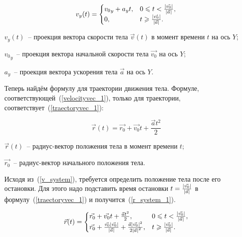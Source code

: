 \begin{equation}\label{v_y_1}
  v_y(t) =
  \begin{cases}
    {v_0}_y + a_y t, & 0  \leqslant t < \frac{\left|\vec{v_0}\right|}{\left|\vec{a}\right|}, \\
    0,               & t \geqslant \frac{\left|\vec{v_0}\right|}{\left|\vec{a}\right|}.
  \end{cases}
\end{equation}

\begin{Underequation}
  \(v_y(t)\)~-- проекция вектора скорости тела \(\vec{v}(t)\) в момент времени \(t\) на ось \(Y\);

  \({v_0}_y\)~-- проекция вектора начальной скорости тела \(\vec{v_0}\) на ось \(Y\);

  \(a_y\)~-- проекция вектора ускорения тела \(\vec{a}\) на ось \(Y\).
\end{Underequation}

Теперь найдём формулу для траектории движения тела. Формуле, соответствующей~(\ref{velocityvec_1}),
только для траектории, соответствует~(\ref{traectoryvec_1}):

\begin{equation}\label{traectoryvec_1}
  \vec{r}(t) = \vec{r_0} + \vec{v_0}t + \frac{\vec{a}t^2}{2}
\end{equation}

\begin{Underequation}
  \(\vec{r}(t)\)~-- радиус-вектор положения тела в момент времени \(t\);

  \(\vec{r_0}\)~-- радиус-вектор начального положения тела.
\end{Underequation}

Исходя из~(\ref{v_system}), требуется определить положение тела после его остановки.
Для этого надо подставить время остановки \(t = \frac{\left|\vec{v_0}\right|}{\left|\vec{a}\right|}\) в формулу~(\ref{traectoryvec_1}) и получится~(\ref{r_system_1}).

\begin{equation}\label{r_system_1}
  \vec{r}(t) = \begin{cases}
    \vec{r_0} + \vec{v_0}t + \frac{\vec{a}t^2}{2},                                                                                                 & 0 \leqslant t < \frac{\left|\vec{v_0}\right|}{\left|\vec{a}\right|}, \\
    \vec{r_0} + \frac{\vec{v_0} \left|\vec{v_0}\right|}{\left|\vec{a}\right|} + \frac{\vec{a} \left|\vec{v_0}\right|^2}{2 \left|\vec{a}\right|^2}, & t \geqslant \frac{\left|\vec{v_0}\right|}{\left|\vec{a}\right|} .
  \end{cases}
\end{equation}

